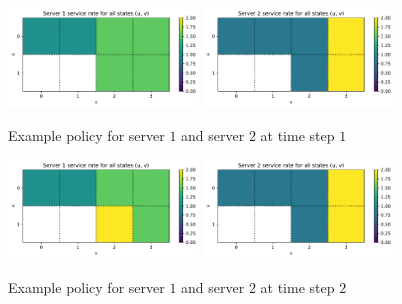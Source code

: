 \begin{figure}[H]
    \includegraphics[width=0.45\textwidth]{chapters/06_agent_based_extension/Bin/reinforcement_learning_policy_example/server_1_1.pdf}
    \includegraphics[width=0.45\textwidth]{chapters/06_agent_based_extension/Bin/reinforcement_learning_policy_example/server_2_1.pdf}
    \caption{Example policy for server \(1\) and server \(2\) at time step \(1\)}
    \label{fig:reinforcement_learning_policy_exmaple_1}
\end{figure}


\begin{figure}[H]
    \includegraphics[width=0.45\textwidth]{chapters/06_agent_based_extension/Bin/reinforcement_learning_policy_example/server_1_2.pdf}
    \includegraphics[width=0.45\textwidth]{chapters/06_agent_based_extension/Bin/reinforcement_learning_policy_example/server_2_2.pdf}
    \caption{Example policy for server \(1\) and server \(2\) at time step \(2\)}
    \label{fig:reinforcement_learning_policy_exmaple_2}
\end{figure}


